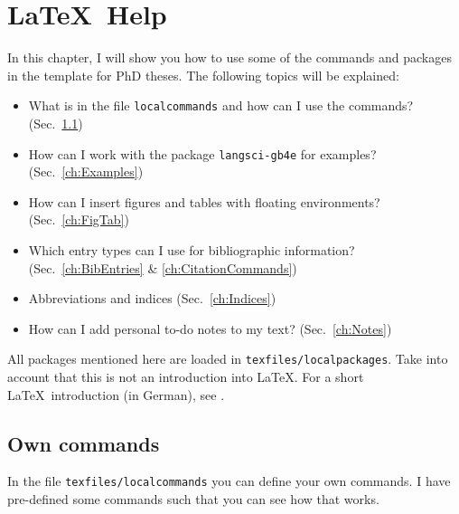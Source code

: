 \chapter{\LaTeX\ Help}
\label{ch:Help}


In this chapter, I will show you how to use some of the commands and packages in the template for PhD theses. The following topics will be explained:

\begin{itemize}
	\item What is in the file \texttt{localcommands} and how can I use the commands? (Sec.~\ref{ch:Commands})
	
	\item How can I work with the package \texttt{langsci-gb4e} for examples? (Sec.~\ref{ch:Examples})
		
	\item How can I insert figures and tables with floating environments? (Sec.~\ref{ch:FigTab})
	
	\item Which entry types can I use for bibliographic information? (Sec.~\ref{ch:BibEntries} \& \ref{ch:CitationCommands})
		
	\item Abbreviations and indices (Sec.~\ref{ch:Indices})

	\item How can I add personal to-do notes to my text? (Sec.~\ref{ch:Notes})
\end{itemize}

All packages mentioned here are loaded in \texttt{texfiles/localpackages}.
Take into account that this is not an introduction into \LaTeX . For a short \LaTeX\  introduction (in German), see \citet{Freitag&MyP15a}.


\section{Own commands}
\label{ch:Commands}

In the file \texttt{texfiles/localcommands} you can define your own commands. I have pre-defined some commands such that you can see how that works.

